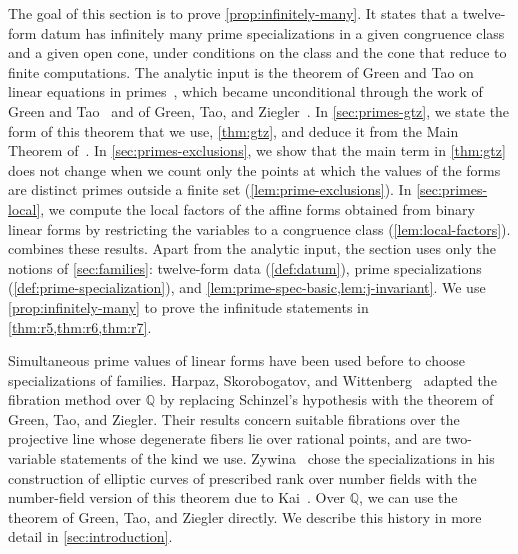 \documentclass[12pt,oneside,openany]{book}
\theoremstyle{definition}
\theoremstyle{plain}
\numberwithin{equation}{chapter}
\theoremstyle{plain}
\theoremstyle{definition}
\theoremstyle{remark}
\newcommand{\Q}{\mathbb Q}
\begin{document}
The goal of this section is to prove \cref{prop:infinitely-many}. It states that a twelve-form datum has infinitely many prime specializations in a given congruence class and a given open cone, under conditions on the class and the cone that reduce to finite computations. The analytic input is the theorem of Green and Tao on linear equations in primes~\cite{GT2010}, which became unconditional through the work of Green and Tao~\cite{GT2012} and of Green, Tao, and Ziegler~\cite{GTZ2012}. In \cref{sec:primes-gtz}, we state the form of this theorem that we use, \cref{thm:gtz}, and deduce it from the Main Theorem of~\cite{GT2010}. In \cref{sec:primes-exclusions}, we show that the main term in \cref{thm:gtz} does not change when we count only the points at which the values of the forms are distinct primes outside a finite set (\cref{lem:prime-exclusions}). In \cref{sec:primes-local}, we compute the local factors of the affine forms obtained from binary linear forms by restricting the variables to a congruence class (\cref{lem:local-factors}).  combines these results. Apart from the analytic input, the section uses only the notions of \cref{sec:families}: twelve-form data (\cref{def:datum}), prime specializations (\cref{def:prime-specialization}), and \cref{lem:prime-spec-basic,lem:j-invariant}. We use \cref{prop:infinitely-many} to prove the infinitude statements in \cref{thm:r5,thm:r6,thm:r7}.

Simultaneous prime values of linear forms have been used before to choose specializations of families. Harpaz, Skorobogatov, and Wittenberg~\cite{HSW2014} adapted the fibration method over $\Q$ by replacing Schinzel's hypothesis with the theorem of Green, Tao, and Ziegler. Their results concern suitable fibrations over the projective line whose degenerate fibers lie over rational points, and \cite[Theorem~1.1 and Proposition~1.2]{HSW2014} are two-variable statements of the kind we use. Zywina~\cite[Proposition~5.9]{Zywina2026} chose the specializations in his construction of elliptic curves of prescribed rank over number fields with the number-field version of this theorem due to Kai~\cite[Proposition~13.2]{Kai}. Over $\Q$, we can use the theorem of Green, Tao, and Ziegler directly. We describe this history in more detail in \cref{sec:introduction}.
\end{document}
